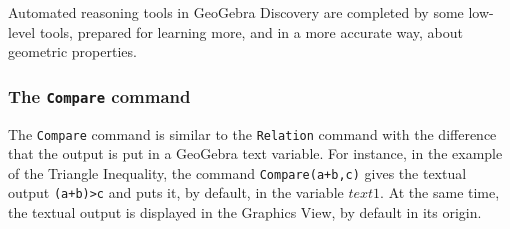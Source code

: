 \documentclass{article}
\begin{document}
Automated reasoning tools in GeoGebra Discovery are completed by some low-level tools,  prepared for learning more,  and in a more accurate way,  about geometric properties.

\subsubsection{The \texttt{Compare} command}
The \texttt{Compare} command is similar to the \texttt{Relation} command with the difference that the output is put in a GeoGebra text variable. For instance, in the example of the Triangle Inequality, the command \texttt{Compare(a+b,c)} gives the textual output \texttt{(a+b)>c} and puts it, by default, in the variable $text1$. At the same time, the textual output is displayed in the Graphics View, by default in its origin.
\end{document}
